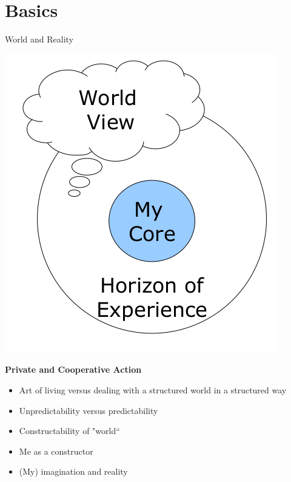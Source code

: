 \documentclass{beamer}
\title{Modelling Sustainable Systems\\ and Semantic Web\\[6pt]
  Digital Space of Action
  \vskip1em}
\subtitle{Lecture in the Module 10-202-2309\\ for Master Computer Science}
\author{Prof. Dr. Hans-Gert Gräbe\\
\url{http://www.informatik.uni-leipzig.de/~graebe}}
\date{May 2021}
\newcommand{\ueberschrift}[1]{\begin{center}\bf #1\end{center}}
\begin{document}
{
\begin{frame}
  \titlepage
\end{frame}}

\section{Basics}
\begin{frame}{World and Reality}

  \begin{minipage}{.4\textwidth}\centering
    \includegraphics[width=\textwidth]{DI-1.png}
  \end{minipage}\hfill
  \begin{minipage}{.55\textwidth}
    \ueberschrift{Private and Cooperative Action}
    \begin{itemize}
    \item Art of living versus dealing with a structured world in a structured
      way
    \item Unpredictability versus predictability
    \item Constructability of "world“
    \item Me as a constructor
    \item (My) imagination and reality
    \end{itemize}
  \end{minipage}

\end{frame}
\end{document}
